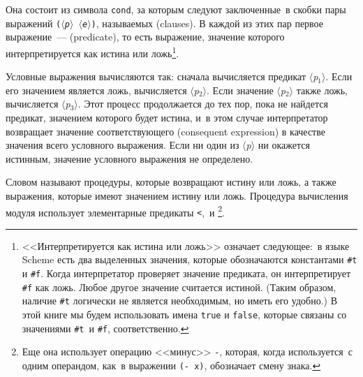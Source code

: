 Она состоит из символа {\tt cond}, за которым следуют
заключенные~в скобки пары выражений
{\tt (\textit{$\langle$p$\rangle$} \textit{$\langle$e$\rangle$})},
называемых 
 (clauses).
В каждой из этих пар первое выражение~---  (predicate),
то есть выражение, значение которого ин\-тер\-пре\-ти\-ру\-ет\-ся как истина или
ложь\footnote{<<Интерпретируется
  как истина или ложь>> означает
следующее:~в языке Scheme есть два выделенных значения, которые
обозначаются константами {\tt \#t} и
{\tt \#f}.  Когда интерпретатор проверяет значение
предиката, он интерпретирует {\tt \#f} как ложь.  Любое
другое значение считается истиной. (Таким образом, наличие
{\tt \#t} логически не является необходимым, но иметь его удобно.)
В этой книге мы будем использовать имена {\tt true}
и {\tt false},
которые связаны со значениями
{\tt \#t}~и {\tt \#f},
соответственно.}.

Условные
выражения вычисляются так: сначала вычисляется
предикат \textit{$\langle$p${}_{\mbox{1}}$$\rangle$}.
Если его значением является ложь, вычисляется \textit{$\langle$p${}_{\mbox{2}}$$\rangle$}.
Если значение \textit{$\langle$p${}_{\mbox{2}}$$\rangle$}
также ложь, вычисляется
\textit{$\langle$p${}_{\mbox{3}}$$\rangle$}.  Этот процесс 
продолжается до тех пор, пока не найдется предикат, значением которого 
будет истина, и~в этом случае интерпретатор возвращает значение
соответствующего  (consequent expression) в качестве значения всего условного выражения.  
Если ни один из
\textit{$\langle$p$\rangle$} ни окажется истинным, значение
условного выражения не определено.

Словом  называют процедуры, 
которые возвращают истину или ложь, а также выражения, которые имеют
значением истину или ложь.  Процедура вычисления модуля использует
элементарные предикаты
{\tt <},~и 
\footnote{Еще она использует операцию <<минус>>
{\tt -},
которая, когда используется~с одним операндом, 
как~в выражении {\tt (- x)}, обозначает смену
знака.}.

